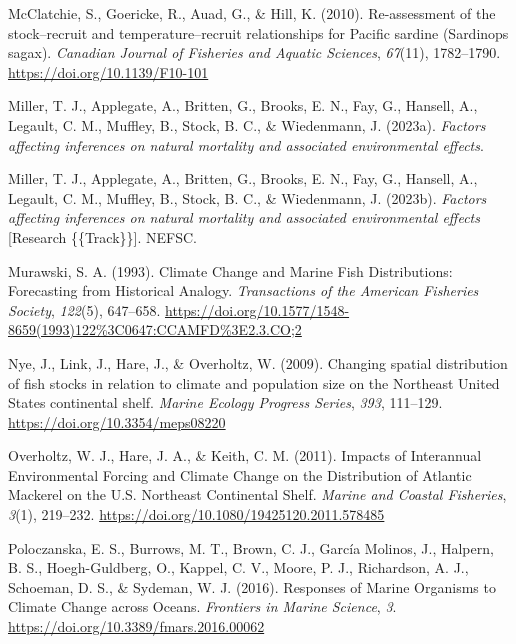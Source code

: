 \documentclass[
  12pt,
]{article}
\newlength{\cslhangindent}
\newenvironment{CSLReferences}[2] %
 {\begin{list}{}{%
  \setlength{\itemindent}{0pt}
  \setlength{\leftmargin}{0pt}
  \setlength{\parsep}{0pt}
  \ifodd #1
   \setlength{\leftmargin}{\cslhangindent}
   \setlength{\itemindent}{-1\cslhangindent}
  \fi
  \setlength{\itemsep}{#2\baselineskip}}}
 {\end{list}}
\begin{document}
\begin{CSLReferences}{1}{2}
McClatchie, S., Goericke, R., Auad, G., \& Hill, K. (2010). Re-assessment of the stock--recruit and temperature--recruit relationships for {Pacific} sardine ({Sardinops} sagax). \emph{Canadian Journal of Fisheries and Aquatic Sciences}, \emph{67}(11), 1782--1790. \url{https://doi.org/10.1139/F10-101}

Miller, T. J., Applegate, A., Britten, G., Brooks, E. N., Fay, G., Hansell, A., Legault, C. M., Muffley, B., Stock, B. C., \& Wiedenmann, J. (2023a). \emph{Factors affecting inferences on natural mortality and associated environmental effects}.

Miller, T. J., Applegate, A., Britten, G., Brooks, E. N., Fay, G., Hansell, A., Legault, C. M., Muffley, B., Stock, B. C., \& Wiedenmann, J. (2023b). \emph{Factors affecting inferences on natural mortality and associated environmental effects} {[}Research \{\{Track\}\}{]}. NEFSC.

Murawski, S. A. (1993). Climate Change and Marine Fish Distributions: Forecasting from Historical Analogy. \emph{Transactions of the American Fisheries Society}, \emph{122}(5), 647--658. \url{https://doi.org/10.1577/1548-8659(1993)122\%3C0647:CCAMFD\%3E2.3.CO;2}

Nye, J., Link, J., Hare, J., \& Overholtz, W. (2009). Changing spatial distribution of fish stocks in relation to climate and population size on the Northeast United States continental shelf. \emph{Marine Ecology Progress Series}, \emph{393}, 111--129. \url{https://doi.org/10.3354/meps08220}

Overholtz, W. J., Hare, J. A., \& Keith, C. M. (2011). Impacts of Interannual Environmental Forcing and Climate Change on the Distribution of Atlantic Mackerel on the U.S. Northeast Continental Shelf. \emph{Marine and Coastal Fisheries}, \emph{3}(1), 219--232. \url{https://doi.org/10.1080/19425120.2011.578485}

Poloczanska, E. S., Burrows, M. T., Brown, C. J., García Molinos, J., Halpern, B. S., Hoegh-Guldberg, O., Kappel, C. V., Moore, P. J., Richardson, A. J., Schoeman, D. S., \& Sydeman, W. J. (2016). Responses of Marine Organisms to Climate Change across Oceans. \emph{Frontiers in Marine Science}, \emph{3}. \url{https://doi.org/10.3389/fmars.2016.00062}


\end{CSLReferences}
\end{document}
